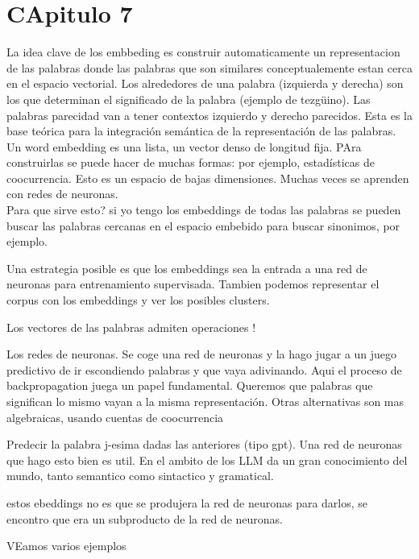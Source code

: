 \chapter{CApitulo 7}\label{Chapter5} 

La idea clave de los embbeding es construir automaticamente un representacion de las palabras donde las palabras que son similares conceptualemente estan cerca en el espacio vectorial. Los alrededores de una palabra (izquierda y derecha) son los que determinan el significado de la palabra (ejemplo de tezgüino). Las palabras parecidad van a tener contextos izquierdo y derecho parecidos. Esta es la base teórica para la integración semántica de la representación de las palabras. \\

Un word embedding es una lista, un vector denso de longitud fija. PAra construirlas se puede hacer de muchas formas: por ejemplo, estadísticas de coocurrencia. Esto es un espacio de bajas dimensiones. Muchas veces se aprenden con redes de neuronas. \\

Para que sirve esto? si yo tengo los embeddings de todas las palabras se pueden buscar las palabras cercanas en el espacio embebido para buscar sinonimos, por ejemplo. 

Una estrategia posible es que los embeddings sea la entrada a una red de neuronas para entrenamiento supervisada. Tambien podemos representar el corpus con los embeddings y ver los posibles clusters. 

Los vectores de las palabras admiten operaciones !

Los redes de neuronas. Se coge una red de neuronas y la hago jugar a un juego predictivo de ir escondiendo palabras y que vaya adivinando. Aqui el proceso de backpropagation juega un papel fundamental. Queremos que palabras que significan lo mismo vayan a la misma representación. Otras alternativas son mas algebraicas, usando cuentas de coocurrencia 


Predecir la palabra j-esima dadas las anteriores (tipo gpt). Una red de neuronas que hago esto bien es util. En el ambito de los LLM da un gran conocimiento del mundo, tanto semantico como sintactico y gramatical. 

estos ebeddings no es que se produjera la red de neuronas para darlos, se encontro que era un subproducto de la red de neuronas.

VEamos varios ejemplos

